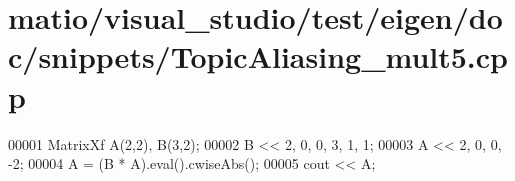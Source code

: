 \hypertarget{matio_2visual__studio_2test_2eigen_2doc_2snippets_2_topic_aliasing__mult5_8cpp_source}{}\section{matio/visual\+\_\+studio/test/eigen/doc/snippets/\+Topic\+Aliasing\+\_\+mult5.cpp}
\label{matio_2visual__studio_2test_2eigen_2doc_2snippets_2_topic_aliasing__mult5_8cpp_source}

\begin{DoxyCode}
00001 MatrixXf A(2,2), B(3,2);
00002 B << 2, 0,  0, 3, 1, 1;
00003 A << 2, 0, 0, -2;
00004 A = (B * A).eval().cwiseAbs();
00005 cout << A;
\end{DoxyCode}
